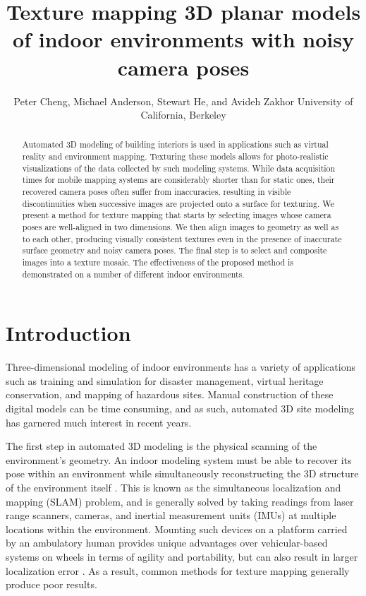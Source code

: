 \documentclass[]{spie}  %
\title{Texture mapping 3D planar models of indoor environments with noisy camera poses}
\author{Peter Cheng, Michael Anderson, Stewart He, and Avideh Zakhor
\skiplinehalf
University of California, Berkeley\\
}
\begin{document}
\maketitle

\begin{abstract}
  Automated 3D modeling of building interiors is used in applications
  such as virtual reality and environment mapping. Texturing these
  models allows for photo-realistic visualizations of the data
  collected by such modeling systems. While data acquisition times for
  mobile mapping systems are considerably shorter than for static
  ones, their recovered camera poses often suffer from inaccuracies,
  resulting in visible discontinuities when successive images are
  projected onto a surface for texturing. We present a method for
  texture mapping that starts by selecting images whose camera poses
  are well-aligned in two dimensions. We then align images to geometry
  as well as to each other, producing visually consistent textures
  even in the presence of inaccurate surface geometry and noisy camera
  poses. The final step is to select and composite images into a
  texture mosaic. The effectiveness of the proposed method is
  demonstrated on a number of different indoor environments.
\end{abstract}



\section{Introduction}
\label{sec:introduction} %
Three-dimensional modeling of indoor environments has a variety of
applications such as training and simulation for disaster management,
virtual heritage conservation, and mapping of hazardous sites. Manual
construction of these digital models can be time consuming, and as
such, automated 3D site modeling has garnered much interest in recent
years.

The first step in automated 3D modeling is the physical scanning of
the environment's geometry. An indoor modeling system must be able to
recover its pose within an environment while simultaneously
reconstructing the 3D structure of the environment itself
\cite{chen2010indoor, hz, kua2012loopclosure, liu2010indoor}. This is
known as the simultaneous localization and mapping (SLAM) problem, and
is generally solved by taking readings from laser range scanners,
cameras, and inertial measurement units (IMUs) at multiple locations
within the environment. Mounting such devices on a platform carried by
an ambulatory human provides unique advantages over vehicular-based
systems on wheels in terms of agility and portability, but can also
result in larger localization error \cite{liu2010indoor}. As a result,
common methods for texture mapping generally produce poor results.
\end{document}
